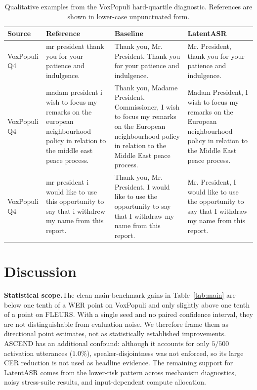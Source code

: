 \documentclass[a4paper]{article}
\newcommand{\method}{LatentASR}
\begin{document}
\begin{table}[ht]
  \caption{Qualitative examples from the VoxPopuli hard-quartile diagnostic. References are shown in lower-case unpunctuated form.}
  \label{tab:qualitative}
  \centering
  \footnotesize
  \setlength{\tabcolsep}{4pt}
  \renewcommand{\arraystretch}{1.1}
  \begin{tabular}{@{}p{} p{} p{} p{}@{}}
    \toprule
    \textbf{Source} & \textbf{Reference} & \textbf{Baseline} & \textbf{\method{}} \\
    \midrule
    VoxPopuli Q4 & mr president thank you for your patience and indulgence. & Thank you, Mr. President. Thank you for your patience and indulgence. & Mr. President, thank you for your patience and indulgence. \\
    \midrule
    VoxPopuli Q4 & madam president i wish to focus my remarks on the european neighbourhood policy in relation to the middle east peace process. & Thank you, Madame President. Commissioner, I wish to focus my remarks on the European neighbourhood policy in relation to the Middle East peace process. & Madam President, I wish to focus my remarks on the European neighbourhood policy in relation to the Middle East peace process. \\
    \midrule
    VoxPopuli Q4 & mr president i would like to use this opportunity to say that i withdrew my name from this report. & Thank you, Mr. President. I would like to use the opportunity to say that I withdraw my name from this report. & Mr. President, I would like to use the opportunity to say that I withdraw my name from this report. \\
    \bottomrule
  \end{tabular}
\end{table}

\section{Discussion}
\label{sec:discussion}

\textbf{Statistical scope.}\quad The clean main-benchmark gains in Table~\ref{tab:main} are below one tenth of a WER point on VoxPopuli and only slightly above one tenth of a point on FLEURS. With a single seed and no paired confidence interval, they are not distinguishable from evaluation noise. We therefore frame them as directional point estimates, not as statistically established improvements. ASCEND has an additional confound: although it accounts for only $5/500$ activation utterances ($1.0\%$), speaker-disjointness was not enforced, so its large CER reduction is not used as headline evidence. The remaining support for \method{} comes from the lower-risk pattern across mechanism diagnostics, noisy stress-suite results, and input-dependent compute allocation.
\end{document}
